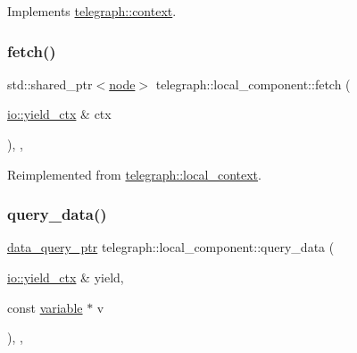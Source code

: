 Implements \hyperlink{classtelegraph_1_1context_a0798d49ea0874a870d4c980f6f09b6c2}{telegraph\+::context}.

\mbox{\label{classtelegraph_1_1local__component_abbeb3b12dc95e19e1a2972e9a374fd33}} 
\subsubsection{\texorpdfstring{fetch()}{fetch()}}
{\footnotesize\ttfamily std\+::shared\+\_\+ptr$<$\hyperlink{classtelegraph_1_1node}{node}$>$ telegraph\+::local\+\_\+component\+::fetch (\begin{DoxyParamCaption}\item[{\hyperlink{structboost_1_1asio_1_1yield__ctx}{io\+::yield\+\_\+ctx} \&}]{ctx }\end{DoxyParamCaption})\hspace{0.3cm}{\ttfamily [inline]}, {\ttfamily [override]}, {\ttfamily [virtual]}}



Reimplemented from \hyperlink{classtelegraph_1_1local__context_aefadafdf25e6f6ba23c4b332872836e2}{telegraph\+::local\+\_\+context}.

\mbox{\label{classtelegraph_1_1local__component_a4410ca44a41de1c139273efd31f281c4}} 
\subsubsection{\texorpdfstring{query\+\_\+data()}{query\_data()}\hspace{0.1cm}{\footnotesize\ttfamily [1/2]}}
{\footnotesize\ttfamily \hyperlink{namespacetelegraph_a6ffe775ac48dca2a4013b53d692199c8}{data\+\_\+query\+\_\+ptr} telegraph\+::local\+\_\+component\+::query\+\_\+data (\begin{DoxyParamCaption}\item[{\hyperlink{structboost_1_1asio_1_1yield__ctx}{io\+::yield\+\_\+ctx} \&}]{yield,  }\item[{const \hyperlink{classtelegraph_1_1variable}{variable} $\ast$}]{v }\end{DoxyParamCaption})\hspace{0.3cm}{\ttfamily [inline]}, {\ttfamily [override]}, {\ttfamily [virtual]}}



